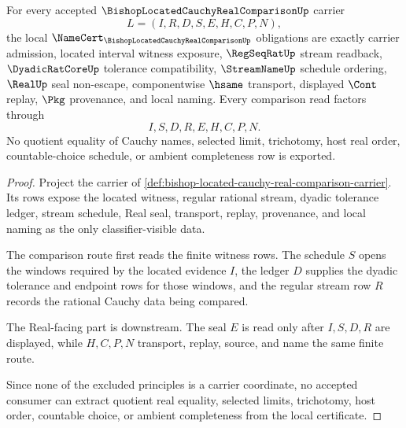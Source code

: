 \begin{theorem}
\label{thm:bishop-located-cauchy-real-comparison-namecert-obligations}
For every accepted $\BishopLocatedCauchyRealComparisonUp$ carrier
$$
L=(I,R,D,S,E,H,C,P,N),
$$
the local $\NameCert_{\BishopLocatedCauchyRealComparisonUp}$ obligations are exactly carrier admission, located interval witness exposure, $\RegSeqRatUp$ stream readback, $\DyadicRatCoreUp$ tolerance compatibility, $\StreamNameUp$ schedule ordering, $\RealUp$ seal non-escape, componentwise $\hsame$ transport, displayed $\Cont$ replay, $\Pkg$ provenance, and local naming. Every comparison read factors through
$$
I,S,D,R,E,H,C,P,N .
$$
No quotient equality of Cauchy names, selected limit, trichotomy, host real order, countable-choice schedule, or ambient completeness row is exported.
\end{theorem}
\begin{proof}
Project the carrier of \autoref{def:bishop-located-cauchy-real-comparison-carrier}. Its rows expose the located witness, regular rational stream, dyadic tolerance ledger, stream schedule, Real seal, transport, replay, provenance, and local naming as the only classifier-visible data.

The comparison route first reads the finite witness rows. The schedule $S$ opens the windows required by the located evidence $I$, the ledger $D$ supplies the dyadic tolerance and endpoint rows for those windows, and the regular stream row $R$ records the rational Cauchy data being compared.

The Real-facing part is downstream. The seal $E$ is read only after $I,S,D,R$ are displayed, while $H,C,P,N$ transport, replay, source, and name the same finite route.

Since none of the excluded principles is a carrier coordinate, no accepted consumer can extract quotient real equality, selected limits, trichotomy, host order, countable choice, or ambient completeness from the local certificate.
\end{proof}

